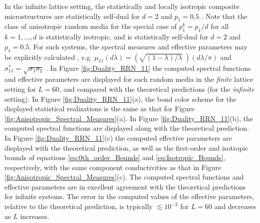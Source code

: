 \documentclass{cmslatex}
\begin{document}
In the infinite lattice setting, the statistically and locally
isotropic composite microstructures are statistically self-dual for
$d=2$ and $p_1=0.5$ \cite{MILTON:2002:TC}. Note that the class of
anisotropic random media for the special case of $p_1^k=p_1/d$ for all
$k=1,\ldots,d$ is statistically isotropic, and is statistically self-dual
for  $d=2$ and $p_1=0.5$. For such systems, the spectral measures and
effective parameters may be explicitly calculated
\cite{MILTON:2002:TC},
e.g. $\mu_{11}(d\lambda)=(\sqrt{(1-\lambda)/\lambda}\;)(d\lambda/\pi)$ and  
$\sigma^*_{11}=\sqrt{\sigma_1\sigma_2}\;$. In Figure \ref{fig:Duality_RRN_11} the 
computed spectral functions and effective parameters are displayed for
such random media in the \emph{finite} lattice setting for $L=60$, and
compared with the theoretical predictions (for the
\emph{infinite} setting). In Figure \ref{fig:Duality_RRN_11}(a), the
bond color scheme for the displayed statistical realizations is the
same as that for Figure \ref{fig:Anisotropic_Spectral_Measures}(a). In
Figure \ref{fig:Duality_RRN_11}(b), the computed spectral functions are 
displayed along with the theoretical prediction. In Figure
\ref{fig:Duality_RRN_11}(c) the computed effective parameters are
displayed with the theoretical prediction, as well as the first-order
and isotropic bounds of equations \eqref{eq:0th_order_Bounds} and
\eqref{eq:Isotropic_Bounds}, respectively, with the same component
conductivities as that in Figure
\ref{fig:Anisotropic_Spectral_Measures}(c). The computed spectral
functions and effective parameters are in excellent agreement with the
theoretical predictions for infinite systems. The error in the computed
values of the effective parameters, relative to the theoretical
prediction, is typically $\lesssim10^{-2}$ for $L=60$ and decreases 
as $L$ increases. 
\end{document}
